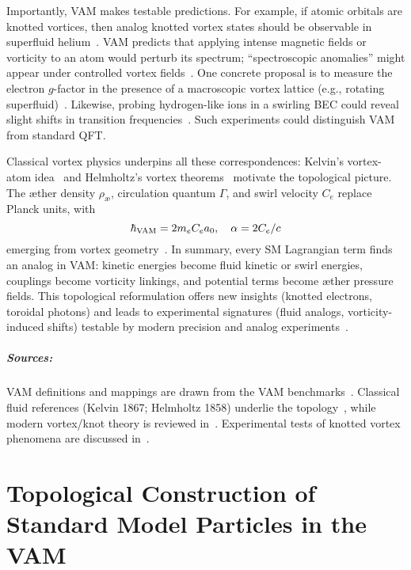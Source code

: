 \documentclass[a4paper,12pt]{article}
\begin{document}
Importantly, VAM makes testable predictions. For example, if atomic orbitals are knotted vortices, then analog knotted vortex states should be observable in superfluid helium~\cite{vam-analog}. VAM predicts that applying intense magnetic fields or vorticity to an atom would perturb its spectrum; ``spectroscopic anomalies'' might appear under controlled vortex fields~\cite{vam-spectroscopy}. One concrete proposal is to measure the electron $g$-factor in the presence of a macroscopic vortex lattice (e.g., rotating superfluid)~\cite{vam-gfactor}. Likewise, probing hydrogen-like ions in a swirling BEC could reveal slight shifts in transition frequencies~\cite{vam-bec1, vam-bec2}. Such experiments could distinguish VAM from standard QFT.

Classical vortex physics underpins all these correspondences: Kelvin's vortex-atom idea~\cite{kelvin-vortex} and Helmholtz's vortex theorems~\cite{helmholtz-vortex} motivate the topological picture. The æther density $\rho_{æ}$, circulation quantum $\Gamma$, and swirl velocity $C_e$ replace Planck units, with
\begin{equation}
    \hbar_{\rm VAM} = 2 m_e C_e a_0, \quad \alpha = 2C_e/c
\end{equation}
emerging from vortex geometry~\cite{vam-geometry1, vam-geometry2}. In summary, every SM Lagrangian term finds an analog in VAM: kinetic energies become fluid kinetic or swirl energies, couplings become vorticity linkings, and potential terms become æther pressure fields. This topological reformulation offers new insights (knotted electrons, toroidal photons) and leads to experimental signatures (fluid analogs, vorticity-induced shifts) testable by modern precision and analog experiments~\cite{vam-expt1, vam-expt2}.

\paragraph{Sources:} VAM definitions and mappings are drawn from the VAM benchmarks~\cite{vam-bench1, vam-bench2}. Classical fluid references (Kelvin 1867; Helmholtz 1858) underlie the topology~\cite{kelvin-vortex, helmholtz-vortex}, while modern vortex/knot theory is reviewed in~\cite{vam-knot1, vam-knot2}. Experimental tests of knotted vortex phenomena are discussed in~\cite{vam-expt3, vam-expt4}.



\chapter*{Topological Construction of Standard Model Particles in the VAM}
\end{document}
